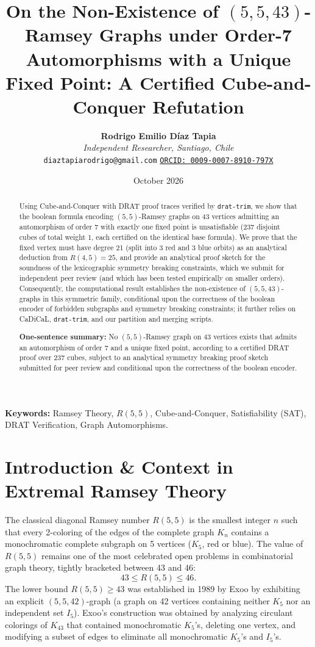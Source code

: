 \documentclass[11pt,a4paper]{article}
\title{\textbf{On the Non-Existence of $(5,5,43)$-Ramsey Graphs under Order-7 Automorphisms with a Unique Fixed Point: A Certified Cube-and-Conquer Refutation}}
\author{
    \textbf{Rodrigo Emilio Díaz Tapia}\\
    \textit{Independent Researcher, Santiago, Chile}\\
    \texttt{diaztapiarodrigo@gmail.com} \quad \href{https://orcid.org/0009-0007-8910-797X}{\texttt{ORCID: 0009-0007-8910-797X}}
}
\date{October 2026}
\theoremstyle{definition}
\begin{document}
\maketitle

\begin{abstract}
Using Cube-and-Conquer with DRAT proof traces verified by \texttt{drat-trim}, we show that the boolean formula encoding $(5,5)$-Ramsey graphs on 43 vertices admitting an automorphism of order 7 with exactly one fixed point is unsatisfiable (237 disjoint cubes of total weight 1, each certified on the identical base formula). We prove that the fixed vertex must have degree 21 (split into 3 red and 3 blue orbits) as an analytical deduction from $R(4,5)=25$, and provide an analytical proof sketch for the soundness of the lexicographic symmetry breaking constraints, which we submit for independent peer review (and which has been tested empirically on smaller orders). Consequently, the computational result establishes the non-existence of $(5,5,43)$-graphs in this symmetric family, conditional upon the correctness of the boolean encoder of forbidden subgraphs and symmetry breaking constraints; it further relies on CaDiCaL, \texttt{drat-trim}, and our partition and merging scripts.

\vspace{0.5em}
\noindent\textbf{One-sentence summary:} No $(5,5)$-Ramsey graph on 43 vertices exists that admits an automorphism of order 7 and a unique fixed point, according to a certified DRAT proof over 237 cubes, subject to an analytical symmetry breaking proof sketch submitted for peer review and conditional upon the correctness of the boolean encoder.
\end{abstract}

\noindent\textbf{Keywords:} Ramsey Theory, $R(5,5)$, Cube-and-Conquer, Satisfiability (SAT), DRAT Verification, Graph Automorphisms.

\vspace{1em}

\section{Introduction \& Context in Extremal Ramsey Theory}

The classical diagonal Ramsey number $R(5,5)$ is the smallest integer $n$ such that every 2-coloring of the edges of the complete graph $K_n$ contains a monochromatic complete subgraph on 5 vertices ($K_5$, red or blue). The value of $R(5,5)$ remains one of the most celebrated open problems in combinatorial graph theory, tightly bracketed between 43 and 46:
\[
43 \le R(5,5) \le 46.
\]
The lower bound $R(5,5) \ge 43$ was established in 1989 by Exoo \cite{exoo1989} by exhibiting an explicit $(5,5,42)$-graph (a graph on 42 vertices containing neither $K_5$ nor an independent set $I_5$). Exoo's construction was obtained by analyzing circulant colorings of $K_{43}$ that contained monochromatic $K_5$'s, deleting one vertex, and modifying a subset of edges to eliminate all monochromatic $K_5$'s and $I_5$'s.
\end{document}
